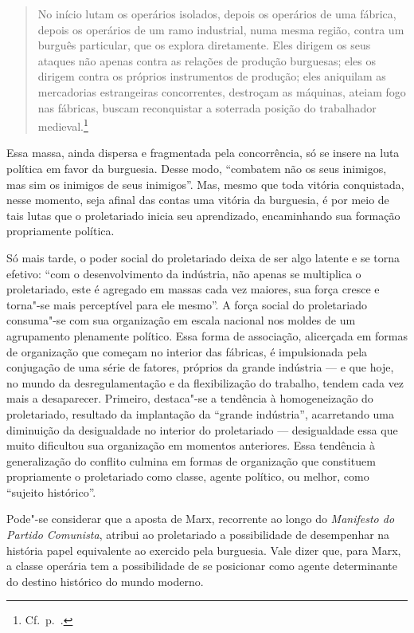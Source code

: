 \begin{quote} 
No início lutam os operários isolados, depois os operários de uma
fábrica, depois os operários de um ramo industrial, numa mesma região,
contra um burguês particular, que os explora diretamente. Eles dirigem os seus
ataques não apenas contra as relações de produção burguesas; eles os
dirigem contra os próprios instrumentos de produção; eles aniquilam as
mercadorias estrangeiras concorrentes, destroçam as máquinas, ateiam
fogo nas fábricas, buscam reconquistar a soterrada posição do
trabalhador medieval.\footnote{ Cf.~p.~\pageref{6}.}
\end{quote} 

Essa massa, ainda dispersa e fragmentada pela concorrência, só
se insere na luta política em favor da burguesia. Desse modo,
“combatem não os seus inimigos, mas sim os inimigos de seus inimigos”.
Mas, mesmo que toda vitória conquistada, nesse momento, seja afinal das
contas uma vitória da burguesia, é por meio de tais lutas que o
proletariado inicia seu aprendizado, encaminhando sua formação
propriamente política.

Só mais tarde, o poder social do proletariado deixa de ser algo latente
e se torna efetivo: “com o desenvolvimento da indústria, não apenas
se multiplica o proletariado, este é agregado em massas cada vez maiores,
sua força cresce e torna"-se mais perceptível para ele mesmo”. A força
social do proletariado consuma"-se com sua organização em escala
nacional nos moldes de um agrupamento plenamente político. Essa forma
de associação, alicerçada em formas de organização que começam no
interior das fábricas, é impulsionada pela conjugação de uma série de
fatores, próprios da grande indústria --- e que hoje, no mundo da
desregulamentação e da flexibilização do trabalho, tendem cada vez mais
a desaparecer. Primeiro, destaca"-se a tendência à homogeneização do
proletariado, resultado da implantação da “grande indústria”,
acarretando uma diminuição da desigualdade no interior do proletariado
--- desigualdade essa que muito dificultou sua organização em momentos
anteriores. Essa tendência à generalização do conflito culmina em
formas de organização que constituem propriamente o proletariado como
classe, agente político, ou melhor, como “sujeito histórico”.

Pode"-se considerar que a aposta de Marx, recorrente ao longo do
\textit{Manifesto do Partido Comunista}, atribui ao proletariado a
possibilidade de desempenhar na história papel equivalente ao exercido
pela burguesia. Vale dizer que, para Marx, a classe operária tem a
possibilidade de se posicionar como agente determinante do destino
histórico do mundo moderno. 

